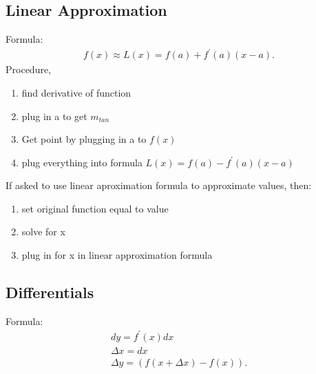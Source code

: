 \documentclass{report}
\begin{document}
    \subsection{Linear Approximation}
    \bigbreak \noindent \bigbreak \noindent
    Formula:
    \begin{align*}
      f(x) \approx  L(x) =f(a) + f^{\prime}(a)(x-a)
    .\end{align*}
    \bigbreak \noindent \bigbreak \noindent
    \bigbreak \noindent \bigbreak \noindent
    Procedure, 
    \begin{enumerate}
      \item find derivative of function
      \item plug in a to get $m_{tan} $
      \item Get point by plugging in a to $f(x)$
      \item plug everything into formula $L(x) = f(a)- f^{\prime}(a)(x-a) $
    \end{enumerate}
    \bigbreak \noindent \bigbreak \noindent
    If asked to use linear aproximation formula to approximate values, then:
    \begin{enumerate}
      \item set original function equal to value
      \item solve for x
      \item plug in for x in linear approximation formula
    \end{enumerate}

    \bigbreak \noindent \bigbreak \noindent 
    \subsection{Differentials}
    \bigbreak \noindent 
    Formula:
    \begin{align*}
      dy = f^{\prime}(x)dx \\
      \Delta x = dx \\
      \Delta y = (f(x+\Delta x) -f(x))
    .\end{align*}
    \bigbreak \noindent 


    \pagebreak \bigbreak \noindent
\end{document}
